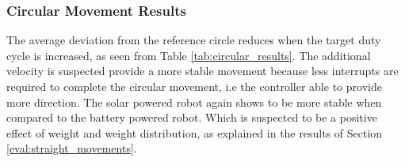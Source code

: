 \subsubsection{Circular Movement Results}
The average deviation from the reference circle reduces when the target duty cycle is increased, as seen from Table \ref{tab:circular_results}.
The additional velocity is suspected provide a more stable movement because less interrupts are required to complete the circular movement, i.e the controller able to provide more direction.
The solar powered robot again shows to be more stable when compared to the battery powered robot.
Which is suspected to be a positive effect of weight and weight distribution, as explained in the results of Section \ref{eval:straight_movements}.
